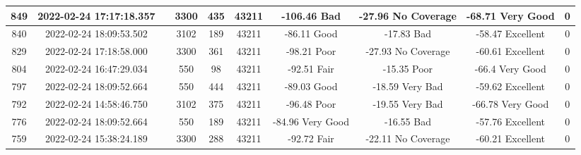 \begin{longtable*}{|c|c|c|c|c|c|c|c|c|c|}
849&2022-02-24 17:17:18.357&&3300&435&43211& -106.46   Bad         & -27.96    No Coverage & -68.71    Very Good   & 0\\\hline
{}840&2022-02-24 18:09:53.502&&3102&189&43211& -86.11    Good        & -17.83    Bad         & -58.47    Excellent   & 0\\\hline
{}829&2022-02-24 17:18:58.000&&3300&361&43211& -98.21    Poor        & -27.93    No Coverage & -60.61    Excellent   & 0\\\hline
{}804&2022-02-24 16:47:29.034&&550&98&43211& -92.51    Fair        & -15.35    Poor        & -66.4     Very Good   & 0\\\hline
{}797&2022-02-24 18:09:52.664&&550&444&43211& -89.03    Good        & -18.59    Very Bad    & -59.62    Excellent   & 0\\\hline
{}792&2022-02-24 14:58:46.750&&3102&375&43211& -96.48    Poor        & -19.55    Very Bad    & -66.78    Very Good   & 0\\\hline
{}776&2022-02-24 18:09:52.664&&550&189&43211& -84.96    Very Good   & -16.55    Bad         & -57.76    Excellent   & 0\\\hline
{}759&2022-02-24 15:38:24.189&&3300&288&43211& -92.72    Fair        & -22.11    No Coverage & -60.21    Excellent   & 0\\\hline

\end{longtable*}
